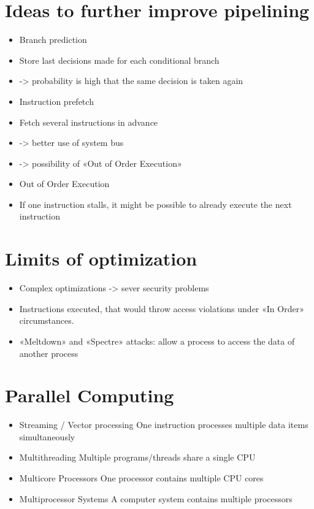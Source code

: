 \documentclass[10pt]{article}
\begin{document}
\section*{Ideas to further improve pipelining}
\begin{itemize}
  \item Branch prediction
  \item Store last decisions made for each conditional branch
  \item -> probability is high that the same decision is taken again
  \item Instruction prefetch
  \item Fetch several instructions in advance
  \item -> better use of system bus
  \item -> possibility of «Out of Order Execution»
  \item Out of Order Execution
  \item If one instruction stalls, it might be possible to already execute the next instruction
\end{itemize}

\section*{Limits of optimization}
\begin{itemize}
  \item Complex optimizations -> sever security problems
  \item Instructions executed, that would throw access violations under «In Order» circumstances.
  \item «Meltdown» and «Spectre» attacks: allow a process to access the data of another process
\end{itemize}

\section*{Parallel Computing}
\begin{itemize}
  \item Streaming / Vector processing One instruction processes multiple data items simultaneously
  \item Multithreading Multiple programs/threads share a single CPU
  \item Multicore Processors One processor contains multiple CPU cores
  \item Multiprocessor Systems A computer system contains multiple processors
\end{itemize}
\end{document}
